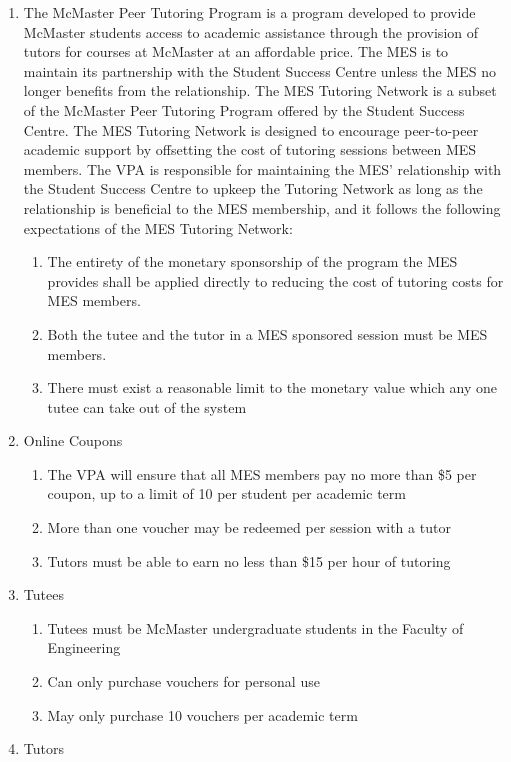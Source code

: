 \begin{enumerate}
 \item
  The McMaster Peer Tutoring Program is a program developed to provide
  McMaster students access to academic assistance through the provision
  of tutors for courses at McMaster at an affordable price. The MES is
  to maintain its partnership with the Student Success Centre unless the
  MES no longer benefits from the relationship. The MES Tutoring Network
  is a subset of the McMaster Peer Tutoring Program offered by the
  Student Success Centre. The MES Tutoring Network is designed to
  encourage peer-to-peer academic support by offsetting the cost of
  tutoring sessions between MES members. The VPA is responsible for
  maintaining the MES' relationship with the Student Success Centre to
  upkeep the Tutoring Network as long as the relationship is beneficial
  to the MES membership, and it follows the following expectations of
  the MES Tutoring Network:

  \begin{enumerate}
   \item
    The entirety of the monetary sponsorship of the program the MES
    provides shall be applied directly to reducing the cost of tutoring
    costs for MES members.
   \item
    Both the tutee and the tutor in a MES sponsored session must be MES
    members.
   \item
    There must exist a reasonable limit to the monetary value which any
    one tutee can take out of the system
  \end{enumerate}
 \item
  Online Coupons

  \begin{enumerate}
   \item
    The VPA will ensure that all MES members pay no more than \$5 per
    coupon, up to a limit of 10 per student per academic term
   \item
    More than one voucher may be redeemed per session with a tutor
   \item
    Tutors must be able to earn no less than \$15 per hour of tutoring
  \end{enumerate}
 \item
  Tutees

  \begin{enumerate}
   \item
    Tutees must be McMaster undergraduate students in the Faculty of
    Engineering
   \item
    Can only purchase vouchers for personal use
   \item
    May only purchase 10 vouchers per academic term
  \end{enumerate}
 \item
  Tutors


\end{enumerate}

